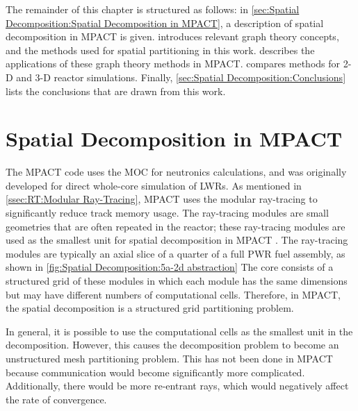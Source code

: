 {{    The remainder of this chapter is structured as follows:
    in \cref{sec:Spatial Decomposition:Spatial Decomposition in MPACT}, a description of spatial decomposition in MPACT is given.
     introduces relevant graph theory concepts, and the methods used for spatial partitioning in this work.
     describes the applications of these graph theory methods in MPACT.
     compares methods for 2-D and 3-D reactor simulations.
    Finally, \cref{sec:Spatial Decomposition:Conclusions} lists the conclusions that are drawn from this work.
  }
  \section{Spatial Decomposition in MPACT}{\label{sec:Spatial Decomposition:Spatial Decomposition in MPACT}
    The MPACT code uses the \ac{MOC} for neutronics calculations, and was originally developed for direct whole-core simulation of \acp{LWR}.
    As mentioned in \cref{ssec:RT:Modular Ray-Tracing}, MPACT uses the modular ray-tracing \cite{Saji2000} to significantly reduce track memory usage.
    The ray-tracing modules are small geometries that are often repeated in the reactor; these ray-tracing modules are used as the smallest unit for spatial decomposition in MPACT \cite{StimpsonPartitioning2017}.
    The ray-tracing modules are typically an axial slice of a quarter of a full \ac{PWR} fuel assembly, as shown in \cref{fig:Spatial Decomposition:5a-2d abstraction}
    The core consists of a structured grid of these modules in which each module has the same dimensions but may have different numbers of computational cells.
    Therefore, in MPACT, the spatial decomposition is a structured grid partitioning problem.

    In general, it is possible to use the computational cells as the smallest unit in the decomposition.
    However, this causes the decomposition problem to become an unstructured mesh partitioning problem.
    This has not been done in MPACT because communication would become significantly more complicated.
    Additionally, there would be more re-entrant rays, which would negatively affect the rate of convergence.

}}
